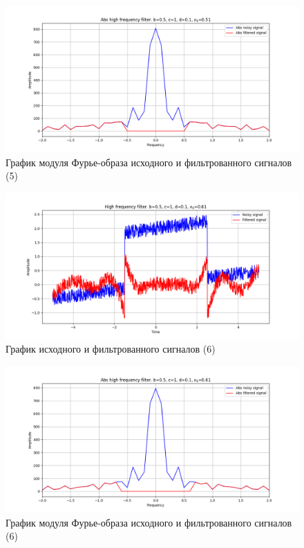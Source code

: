 \documentclass[a4paper, 12pt]{article}
\begin{document}
    \begin{figure}[!htb]
        \centering
        \includegraphics[scale=0.48]{5_abs_u_U_nolow.png}
        \captionsetup{skip=0pt}
        \caption{График модуля Фурье-образа исходного и фильтрованного сигналов (5)}
        \label{fig:fig36}
    \end{figure}
    \begin{figure}[!htb]
        \centering
        \includegraphics[scale=0.48]{6_u_flt_u_nolow.png}
        \captionsetup{skip=0pt}
        \caption{График исходного и фильтрованного сигналов (6)}
        \label{fig:fig37}
    \end{figure}
    \newpage
    \begin{figure}[!htb]
        \centering
        \includegraphics[scale=0.48]{6_abs_u_U_nolow.png}
        \captionsetup{skip=0pt}
        \caption{График модуля Фурье-образа исходного и фильтрованного сигналов (6)}
        \label{fig:fig38}
    \end{figure}
\end{document}
